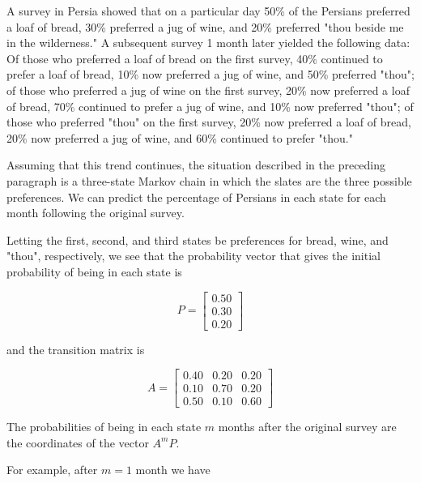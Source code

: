 \documentclass{amsart}
\theoremstyle{definition}
\theoremstyle{remark}
\numberwithin{equation}{section}
\begin{document}
\begin{displayquote}
    A survey in Persia showed that on a particular day 50\% of the Persians preferred a loaf of bread, 30\% preferred a jug of wine, and 20\% preferred "thou beside me in the wilderness."
    A subsequent survey 1 month later yielded the following data: Of those who preferred a loaf of bread on the first survey, 40\% continued to prefer a loaf of bread, 10\% now preferred a jug of wine, and 50\% preferred "thou"; of those who preferred a jug of wine on the first survey, 20\% now preferred a loaf of bread, 70\% continued to prefer a jug of wine, and 10\% now preferred "thou"; of those who preferred "thou" on the first survey, 20\% now preferred a loaf of bread, 20\% now preferred a jug of wine, and 60\% continued to prefer "thou."

    Assuming that this trend continues, the situation described in the preceding paragraph is a three-state Markov chain in which the slates are the three possible preferences. We can predict the percentage of Persians in each state for each month following the original survey.
\end{displayquote}

Letting the first, second, and third states be preferences for bread, wine, and "thou", respectively, we see that the probability vector that gives the initial probability of being in each state is

\begin{equation}
    P = \begin{bmatrix}
           0.50 \\
           0.30 \\
           0.20
         \end{bmatrix}
\end{equation}

and the transition matrix is

\begin{equation}
    A = \begin{bmatrix}
           0.40 & 0.20 & 0.20  \\
           0.10 & 0.70 & 0.20 \\
           0.50 & 0.10 & 0.60
         \end{bmatrix}
\end{equation}

The probabilities of being in each state $m$ months after the original survey are the coordinates of the vector $A^mP$.

For example, after $m = 1$ month we have
\end{document}
